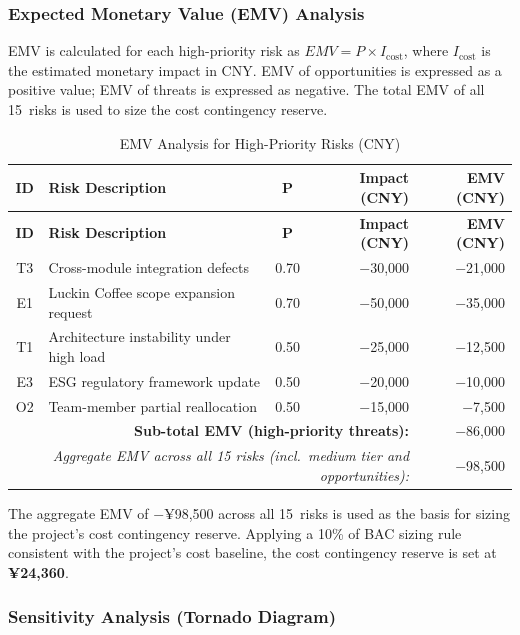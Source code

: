 \documentclass[12pt,a4paper]{article}
\begin{document}
\subsubsection{Expected Monetary Value (EMV) Analysis}

EMV is calculated for each high-priority risk as $EMV = P \times I_{\text{cost}}$, where $I_{\text{cost}}$ is the estimated monetary impact in CNY. EMV of opportunities is expressed as a positive value; EMV of threats is expressed as negative. The total EMV of all 15~risks is used to size the cost contingency reserve.

{\footnotesize
\begin{longtable}{@{}clcrr@{}}
\caption{EMV Analysis for High-Priority Risks (CNY)}\label{tab:emv}\\
\toprule
\textbf{ID} & \textbf{Risk Description} & \textbf{P} & \textbf{Impact (CNY)} & \textbf{EMV (CNY)} \\
\midrule
\endfirsthead
\toprule
\textbf{ID} & \textbf{Risk Description} & \textbf{P} & \textbf{Impact (CNY)} & \textbf{EMV (CNY)} \\
\midrule
\endhead
T3 & Cross-module integration defects                & 0.70 & $-$30{,}000 & $-$21{,}000 \\
E1 & Luckin Coffee scope expansion request            & 0.70 & $-$50{,}000 & $-$35{,}000 \\
T1 & Architecture instability under high load         & 0.50 & $-$25{,}000 & $-$12{,}500 \\
E3 & ESG regulatory framework update                  & 0.50 & $-$20{,}000 & $-$10{,}000 \\
O2 & Team-member partial reallocation                 & 0.50 & $-$15{,}000 & $-$7{,}500 \\
\midrule
\multicolumn{4}{r}{\textbf{Sub-total EMV (high-priority threats):}} & $-$86{,}000 \\
\midrule
\multicolumn{4}{r}{\textit{Aggregate EMV across all 15 risks (incl.\ medium tier and opportunities):}} & $-$98{,}500 \\
\bottomrule
\end{longtable}
}

The aggregate EMV of $-$¥98{,}500 across all 15~risks is used as the basis for sizing the project's cost contingency reserve. Applying a 10\% of BAC sizing rule consistent with the project's cost baseline, the cost contingency reserve is set at \textbf{¥24{,}360}.

\subsubsection{Sensitivity Analysis (Tornado Diagram)}
\end{document}
